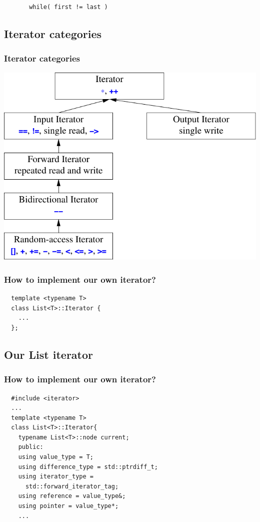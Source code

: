 \begin{frame}[fragile]
  \vfill
  \begin{lstlisting}
       while( first != last )
  \end{lstlisting}
  \vfill
\end{frame}


\subsection{Iterator categories}
\begin{frame}
  \frametitle{Iterator categories}
  \centering
  \includegraphics[height=0.8\textheight]{img/iterators.png}
\end{frame}

\begin{frame}[fragile]
  \frametitle{How to implement our own iterator?}
\begin{lstlisting}
  template <typename T>
  class List<T>::Iterator {
    ...
  };
\end{lstlisting}
\end{frame}

\subsection{Our List iterator}
\begin{frame}[fragile]
  \frametitle{How to implement our own iterator?}
\begin{lstlisting}
  #include <iterator>
  ...
  template <typename T>
  class List<T>::Iterator{
    typename List<T>::node current;
    public:
    using value_type = T;
    using difference_type = std::ptrdiff_t;
    using iterator_type =
      std::forward_iterator_tag;
    using reference = value_type&;
    using pointer = value_type*;
    ...
\end{lstlisting}
\end{frame}


